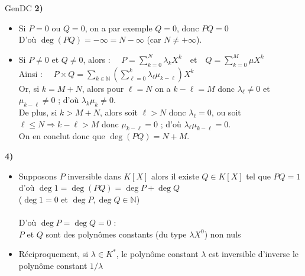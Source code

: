 \documentclass[12pt,a4paper]{report}
\begin{document}
\begin{demonstration}{GenDC}
    \textbf{2)}
    \begin{itemize}[label=$\cdot$, leftmargin=*]
        \item Si $P = 0$ ou $Q = 0$, on a par exemple $Q = 0$, donc $PQ = 0$\\
        D'où $\deg(PQ) = -\infty = N - \infty$ (car $N \neq +\infty$).
        \item\label{DemoDegreProduit} Si $P \neq 0$ et $Q \neq 0$, alors : $\quad \displaystyle P = \sum_{k = 0}^N \lambda_k X^{k} \quad\text{et}\quad Q = \sum_{k = 0}^M \mu X^{k} $\\
        Ainsi : $\quad \displaystyle P \times Q = \sum_{k \in \mathbb{N}} \left( \sum_{\ell = 0}^k \lambda_\ell \mu_{k - \ell} \right) X^k$\\
        Or, si $k = M + N$, alors pour $\ell = N$ on a $k - \ell = M$ donc $\lambda_\ell \neq 0$ et $\mu_{k-\ell} \neq 0$ ; d'où $\lambda_k \mu_k \neq 0$.\\
        De plus, si $k > M + N$, alors soit $\ell > N$ donc $\lambda_\ell = 0$, ou soit $\ell \leqslant N \Rightarrow k-\ell > M$ donc $\mu_{k - \ell} = 0$ ; d'où $\lambda_\ell \mu_{k - \ell} = 0$.\\
        On en conclut donc que $\deg(PQ) = N + M$.
    \end{itemize}

    \textbf{4)} 
    \begin{itemize}[label=$\cdot$, leftmargin=*]
        \item Supposons $P$ inversible dans $K[X]$ alors il existe $Q \in K[X]$ tel que $PQ = 1$\\
         d'où $\deg 1 = \deg (PQ) = \deg P+ \deg Q$ \\
        ($\deg 1 = 0$ et $\deg P, \deg Q \in \mathbb{N}$)\\
        \\
        D'où $\deg P = \deg Q = 0$ :\\
        $P$ et $Q$ sont des polynômes constants (\ie du type $\lambda X^{0}$) non nuls\\
        \item Réciproquement, si $\lambda \in K^{*}$, le polynôme constant $\lambda$ est inversible d'inverse le polynôme constant $1/\lambda$\\
    \end{itemize}
    

\end{demonstration}
\end{document}
